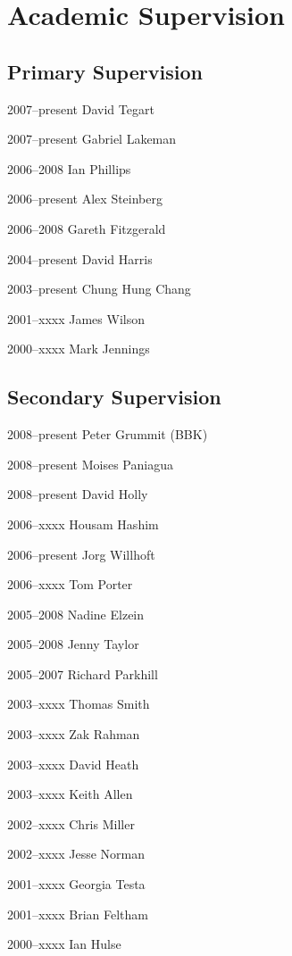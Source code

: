 \documentclass[contbibnum]{cv}
\begin{document}
\section{Academic Supervision}\label{sec:academic_supervision} %

\subsection{Primary Supervision}\label{sub:primary_supervision} %

\begin{topic}
	\item[2007--present] David Tegart 
	\item[2007--present] Gabriel Lakeman 
	\item[2006--2008] Ian Phillips 
	\item[2006--present] Alex Steinberg 
	\item[2006--2008] Gareth Fitzgerald
	\item[2004--present] David Harris 
	\item[2003--present] Chung Hung Chang 
	\item[2001--xxxx] James Wilson 
	\item[2000--xxxx] Mark Jennings
\end{topic}


\subsection{Secondary Supervision}\label{sub:secondary_supervision} %

\begin{topic}
	\item[2008--present] Peter Grummit (BBK) 
	\item[2008--present] Moises Paniagua
	\item[2008--present] David Holly 
	\item[2006--xxxx] Housam Hashim 
	\item[2006--present] Jorg Willhoft
	\item[2006--xxxx] Tom Porter
	\item[2005--2008] Nadine Elzein
	\item[2005--2008] Jenny Taylor
	\item[2005--2007] Richard Parkhill
	\item[2003--xxxx] Thomas Smith 
	\item[2003--xxxx] Zak Rahman 
	\item[2003--xxxx] David Heath 
	\item[2003--xxxx] Keith Allen
	\item[2002--xxxx] Chris Miller 
	\item[2002--xxxx] Jesse Norman
	\item[2001--xxxx] Georgia Testa
	\item[2001--xxxx] Brian Feltham
	\item[2000--xxxx] Ian Hulse
\end{topic}
\end{document}
